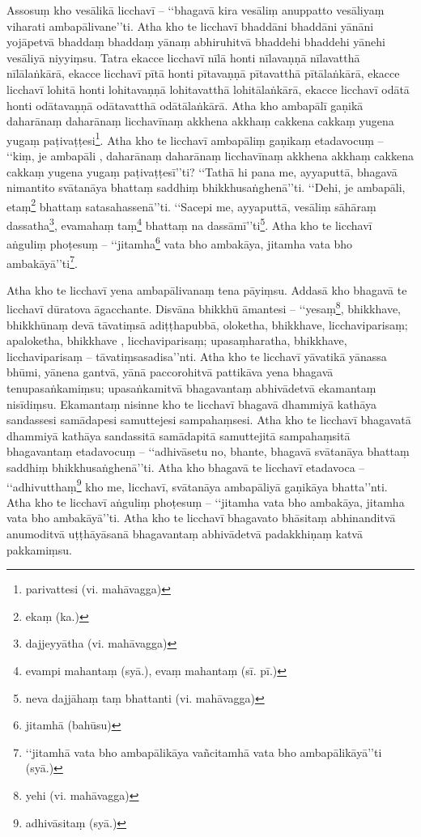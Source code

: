 Assosuṃ kho vesālikā licchavī – ‘‘bhagavā kira vesāliṃ anuppatto vesāliyaṃ viharati ambapālivane’’ti. Atha kho te licchavī bhaddāni bhaddāni yānāni yojāpetvā bhaddaṃ bhaddaṃ yānaṃ abhiruhitvā bhaddehi bhaddehi yānehi vesāliyā niyyiṃsu. Tatra ekacce licchavī nīlā honti nīlavaṇṇā nīlavatthā nīlālaṅkārā, ekacce licchavī pītā honti pītavaṇṇā pītavatthā pītālaṅkārā, ekacce licchavī lohitā honti lohitavaṇṇā lohitavatthā lohitālaṅkārā, ekacce licchavī odātā honti odātavaṇṇā odātavatthā odātālaṅkārā. Atha kho ambapālī gaṇikā daharānaṃ daharānaṃ licchavīnaṃ akkhena akkhaṃ cakkena cakkaṃ yugena yugaṃ paṭivaṭṭesi\footnote{parivattesi (vi. mahāvagga)}. Atha kho te licchavī ambapāliṃ gaṇikaṃ etadavocuṃ – ‘‘kiṃ, je ambapāli , daharānaṃ daharānaṃ licchavīnaṃ akkhena akkhaṃ cakkena cakkaṃ yugena yugaṃ paṭivaṭṭesī’’ti? ‘‘Tathā hi pana me, ayyaputtā, bhagavā nimantito svātanāya bhattaṃ saddhiṃ bhikkhusaṅghenā’’ti. ‘‘Dehi, je ambapāli, etaṃ\footnote{ekaṃ (ka.)} bhattaṃ satasahassenā’’ti. ‘‘Sacepi me, ayyaputtā, vesāliṃ sāhāraṃ dassatha\footnote{dajjeyyātha (vi. mahāvagga)}, evamahaṃ taṃ\footnote{evampi mahantaṃ (syā.), evaṃ mahantaṃ (sī. pī.)} bhattaṃ na dassāmī’’ti\footnote{neva dajjāhaṃ taṃ bhattanti (vi. mahāvagga)}. Atha kho te licchavī aṅguliṃ phoṭesuṃ – ‘‘jitamha\footnote{jitamhā (bahūsu)} vata bho ambakāya, jitamha vata bho ambakāyā’’ti\footnote{‘‘jitamhā vata bho ambapālikāya vañcitamhā vata bho ambapālikāyā’’ti (syā.)}.

Atha kho te licchavī yena ambapālivanaṃ tena pāyiṃsu. Addasā kho bhagavā te licchavī dūratova āgacchante. Disvāna bhikkhū āmantesi – ‘‘yesaṃ\footnote{yehi (vi. mahāvagga)}, bhikkhave, bhikkhūnaṃ devā tāvatiṃsā adiṭṭhapubbā, oloketha, bhikkhave, licchaviparisaṃ; apaloketha, bhikkhave , licchaviparisaṃ; upasaṃharatha, bhikkhave, licchaviparisaṃ – tāvatiṃsasadisa’’nti. Atha kho te licchavī yāvatikā yānassa bhūmi, yānena gantvā, yānā paccorohitvā pattikāva yena bhagavā tenupasaṅkamiṃsu; upasaṅkamitvā bhagavantaṃ abhivādetvā ekamantaṃ nisīdiṃsu. Ekamantaṃ nisinne kho te licchavī bhagavā dhammiyā kathāya sandassesi samādapesi samuttejesi sampahaṃsesi. Atha kho te licchavī bhagavatā dhammiyā kathāya sandassitā samādapitā samuttejitā sampahaṃsitā bhagavantaṃ etadavocuṃ – ‘‘adhivāsetu no, bhante, bhagavā svātanāya bhattaṃ saddhiṃ bhikkhusaṅghenā’’ti. Atha kho bhagavā te licchavī etadavoca – ‘‘adhivutthaṃ\footnote{adhivāsitaṃ (syā.)} kho me, licchavī, svātanāya ambapāliyā gaṇikāya bhatta’’nti. Atha kho te licchavī aṅguliṃ phoṭesuṃ – ‘‘jitamha vata bho ambakāya, jitamha vata bho ambakāyā’’ti. Atha kho te licchavī bhagavato bhāsitaṃ abhinanditvā anumoditvā uṭṭhāyāsanā bhagavantaṃ abhivādetvā padakkhiṇaṃ katvā pakkamiṃsu.

